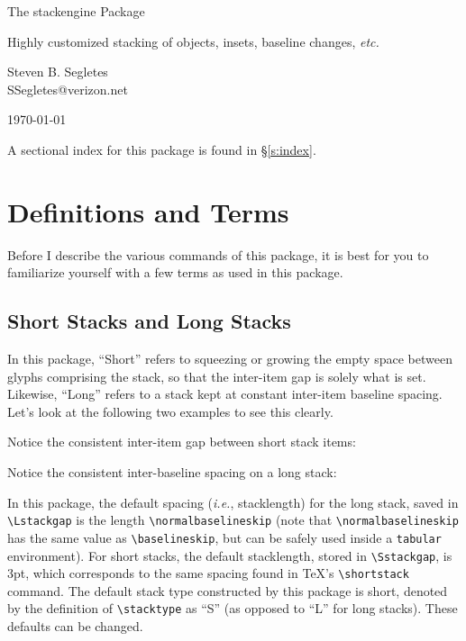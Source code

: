 \documentclass{article}
\def\rl{\rule[-.3pt]{2ex}{.6pt}}
\def\ste{\textsf{stackengine}}
\let\vb\verb
\begin{document}
\begin{center}
\LARGE The {\ste} Package\\
\rule{0em}{.7em}\small Highly customized stacking of objects, insets,
baseline changes, \textit{etc.}\\
\rule{0em}{2.7em}\large Steven B. Segletes\\
SSegletes@verizon.net\\
\rule{0em}{1.7em}\today\\
\stackengineversionnumber%
\end{center}


\sffamily%
A sectional index for this package is found in \S\ref{s:index}.

\rmfamily%

\section{Definitions and Terms}

Before I describe the various commands of this package, it is best for
you to familiarize yourself with a few terms as used in this package.

\subsection{Short Stacks and Long Stacks\label{s:st}}
\def\stacktype{L}
\Huge{}
\normalsize 

In this package, ``Short'' refers to squeezing or growing the empty space 
between glyphs comprising the stack, so that the inter-item gap is solely what
is set.  Likewise, ``Long'' refers to a stack kept at constant
inter-item baseline spacing.  Let's look at the following two
examples to see this clearly.

Notice the consistent inter-item gap between short stack items: 
\Huge
{}%
{\quad{}}
\normalsize

Notice the consistent inter-baseline spacing on a long stack: 
\Huge
\Longstack{{{\rl t}} {{\rl y}} {{\rl k}} {{\rl e}}}%
{\quad{}}
\normalsize\\

\begin{sloppypar}
In this package, the default spacing (\textit{i.e.}, stacklength) for
the long stack, saved in \vb|\Lstackgap| is the length
\vb|\normalbaselineskip| (note that \vb|\normalbaselineskip| has the same 
value as \vb|\baselineskip|, but can be safely used inside a \vb|tabular|
environment).
For short stacks, the default stacklength, stored in
\vb|\Sstackgap|, is 3pt, which corresponds to the same spacing found in
\TeX's \vb|\shortstack| command.  The default stack type constructed by
this package is short, denoted by the definition of \vb|\stacktype| as
``S'' (as opposed to ``L'' for long stacks).  These defaults can be
changed.
\end{sloppypar}
\end{document}
